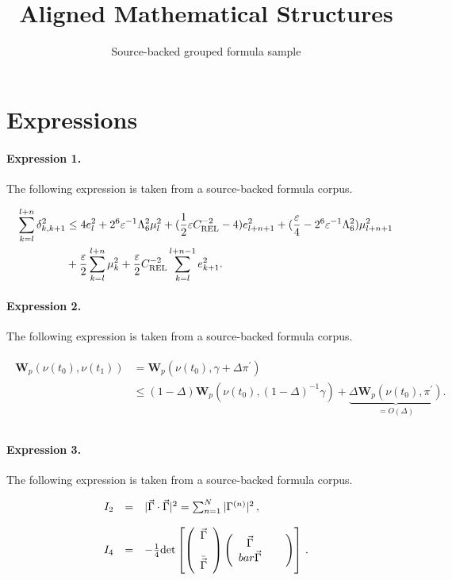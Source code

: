 \documentclass[11pt]{article}
\title{Aligned Mathematical Structures}
\author{Source-backed grouped formula sample}
\date{}
\begin{document}
\maketitle
\section{Expressions}
\paragraph{Expression 1.} The following expression is taken from a source-backed formula corpus.

\begin{align*}\sum_{k=l}^{l+n}\delta_{k,k+1}^2&\leq 4e_l^2+2^{6}\varepsilon^{-1}\Lambda_6^{2}\mu_{l}^2+(\frac{1}{2}\varepsilon C_{\rm{REL}}^{-2}-4)e_{l+n+1}^2+(\frac{\varepsilon}{4}-2^{6}\varepsilon^{-1}\Lambda_6^2)\mu_{l+n+1}^2\\&+\frac{\varepsilon}{2}\sum_{k=l}^{l+n}\mu_k^2+\frac{\varepsilon}{2}C_{\rm{REL}}^{-2}\sum_{k=l}^{l+n-1}e_{k+1}^2.\end{align*}

\paragraph{Expression 2.} The following expression is taken from a source-backed formula corpus.

\begin{align*}\begin{aligned}\boldsymbol{W}_{p}( \nu (t_0), \nu (t_1) ) & = \boldsymbol{W}_{p}\left( \nu (t_0), \gamma + \Delta \pi^\prime \right) \\& \leq (1-\Delta) \boldsymbol{W}_{p}\left( \nu (t_0), (1-\Delta)^{-1} \gamma \right) + \underbrace{ \Delta \boldsymbol{W}_{p}\left( \nu (t_0) , \pi^\prime \right)}_{= O(\Delta)}. \\\end{aligned}\end{align*}

\paragraph{Expression 3.} The following expression is taken from a source-backed formula corpus.

\begin{align*}\begin{array}{rcl}I_{2} & = & |\vec{\Gamma}\cdot\vec{\Gamma}|^{2} =\sum_{n=1}^{N}|\Gamma^{(n)}|^{2}\, ,\\& & \\I_{4} & = & -\frac{1}{4}{\rm det}\left[\left(\begin{array}{c}\vec{\Gamma}\\\\\bar{\vec{\Gamma}}\\\end{array}\right)\left(\begin{array}{cc}\vec{\Gamma}& \ \ \\bar{\vec{\Gamma}}\\\end{array}\right)\right]\, .\end{array}\end{align*}
\end{document}

